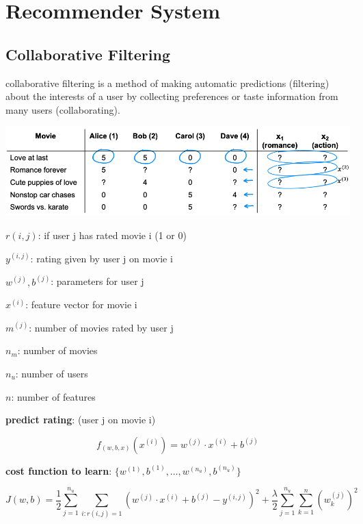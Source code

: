 \documentclass{article}
\begin{document}
\section{Recommender System}

\subsection{Collaborative Filtering}

\noindent collaborative filtering is a method of making automatic predictions (filtering) about the interests of a user by collecting preferences or taste information from many users (collaborating).

\begin{center}
\includegraphics[scale=0.3]{./images/collaborative_filtering_data.png}
\end{center}

\noindent \(r(i, j)\): if user j has rated movie i (1 or 0)

\noindent \(y^{(i, j)}\): rating given by user j on movie i

\noindent \(w^{(j)}, b^{(j)}\): parameters for user j

\noindent \(x^{(i)}\): feature vector for movie i

\noindent \(m^{(j)}\): number of movies rated by user j

\noindent \(n_{m}\): number of movies

\noindent \(n_{u}\): number of users

\noindent \(n\): number of features

\bigskip

\noindent \textbf{predict rating}: (user j on movie i)

\[f_{(w, b, x)}(x^{(i)}) = w^{(j)} \cdot x^{(i)} + b^{(j)}\]

\noindent \textbf{cost function to learn}: \(\{w^{(1)}, b^{(1)}, \dots, w^{(n_u)}, b^{(n_u)}\}\)

\[J(w, b) = \frac{1}{2} \sum_{j = 1}^{n_u} \sum_{i:r(i, j)=1} (w^{(j)} \cdot x^{(i)} + b^{(j)} - y^{(i, j)})^2 + \frac{\lambda}{2} \sum_{j = 1}^{n_u} \sum_{k = 1}^{n} (w_{k}^{(j)})^2\]
\end{document}
